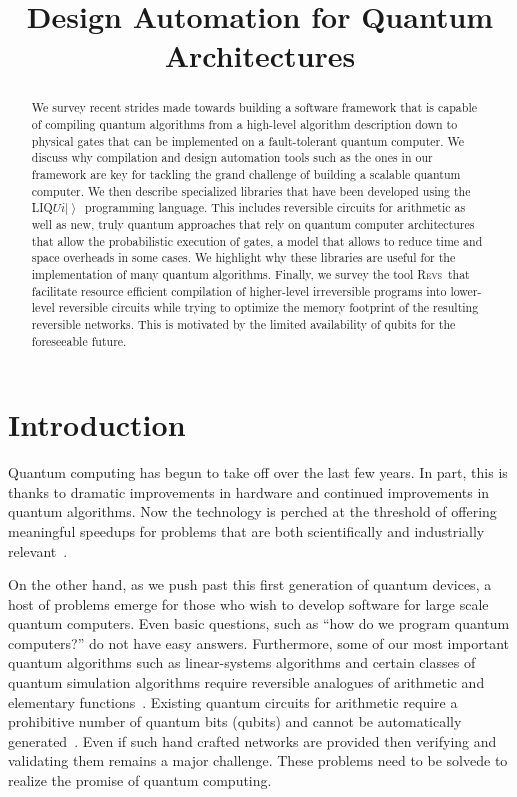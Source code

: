 \documentclass[conference]{IEEEtran}
\title{Design Automation for Quantum Architectures}
\author{%
  \IEEEauthorblockN{Martin Roetteler \qquad Krysta M. Svore \qquad Nathan Wiebe}
  \IEEEauthorblockA{%
Microsoft Research, Redmond, WA, USA
  }
}
\newcommand{\ket}[1]{\left| #1\right\rangle}        %
\newcommand{\Liquid}{LIQ$Ui\ket{}$\ }
\newcommand{\REVS}{{\textsc{Revs}}}
\begin{document}
\maketitle

\begin{abstract}
We survey recent strides made towards building a software framework that is capable of compiling quantum algorithms from a high-level algorithm description down to physical gates that can be implemented on a fault-tolerant quantum computer. We discuss why compilation and design automation tools such as the ones in our framework are key for tackling the grand challenge of building a scalable quantum computer. We then describe specialized libraries that have been developed using the \Liquid programming language. This includes reversible circuits for arithmetic as well as new, truly quantum approaches that rely on quantum computer architectures that allow the probabilistic execution of gates, a model that allows to reduce time and space overheads in some cases. We highlight why these libraries are useful for the implementation of many quantum algorithms. Finally, we survey the tool \REVS~that facilitate resource efficient compilation of higher-level irreversible programs into lower-level reversible circuits while trying to optimize the memory footprint of the resulting reversible networks. This is motivated by the limited availability of qubits for the foreseeable future. 
\end{abstract}

\section{Introduction}
Quantum computing has begun to take off over the last few years. In part, this is thanks to dramatic improvements in hardware and continued improvements in quantum algorithms.  Now the technology
is perched at the threshold of offering meaningful speedups for problems that are both scientifically and industrially relevant~\cite{barends2014superconducting,cross2015quantum,o2016scalable,benedetti2016estimation}.  

On the other hand, as we push past this first generation of quantum devices, a host of problems emerge for those who wish to develop software for large scale quantum computers.  Even basic questions, such as ``how do we program quantum computers?'' do not have easy answers.  Furthermore, some of our most important quantum algorithms such as linear-systems algorithms and certain classes of quantum simulation algorithms require reversible analogues of arithmetic and elementary functions~\cite{harrow2009quantum,babbush2015exponentially,kivlichan2016bounding}. Existing quantum circuits for arithmetic require a prohibitive number of quantum bits (qubits) and cannot be automatically generated~\cite{BHP+15}.  Even if such hand crafted networks are provided then verifying and validating them remains a major challenge.  These problems need to be solvede to realize the promise of quantum computing.
\end{document}
